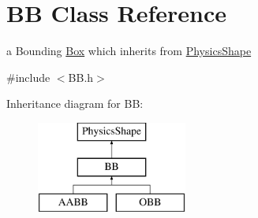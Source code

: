 \hypertarget{class_b_b}{\section{B\+B Class Reference}
\label{class_b_b}
}


a Bounding \hyperlink{class_box}{Box} which inherits from \hyperlink{class_physics_shape}{Physics\+Shape}  




{\ttfamily \#include $<$B\+B.\+h$>$}

Inheritance diagram for B\+B\+:\begin{figure}[H]
\begin{center}
\leavevmode
\includegraphics[height=3.000000cm]{class_b_b}
\end{center}
\end{figure}
